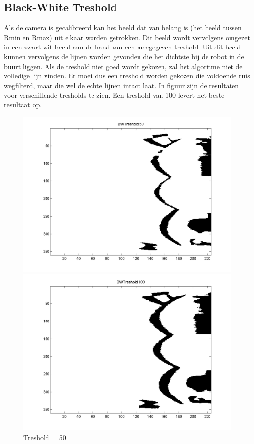 \documentclass[a4paper]{article}
\begin{document}
\subsection{Black-White Treshold}
Als de camera is gecalibreerd kan het beeld dat van belang is (het beeld tussen Rmin en Rmax) uit elkaar worden getrokken. Dit beeld wordt vervolgens omgezet in een zwart wit beeld aan de hand van een meegegeven treshold. Uit dit beeld kunnen vervolgens de lijnen worden gevonden die het dichtste bij de robot in de buurt liggen. Als de treshold niet goed wordt gekozen, zal het algoritme niet de volledige lijn vinden. Er moet dus een treshold worden gekozen die voldoende ruis wegfilterd, maar die wel de echte lijnen intact laat. In figuur zijn de resultaten voor verschillende tresholds te zien. Een treshold van 100 levert het beste resultaat op.
\begin{figure}[htbp]
  \begin{minipage}[b]{0.5\linewidth}
    \centering
    \includegraphics[width=\linewidth]{img/BWTreshold_50.png}
    \caption{Treshold = 50}
    \label{fig:bw50}
  \end{minipage}
  \hspace{0.5cm}
  \begin{minipage}[b]{0.5\linewidth}
    \centering
    \includegraphics[width=\linewidth]{img/BWTreshold_100.png}

\end{minipage}
\end{figure}
\end{document}

